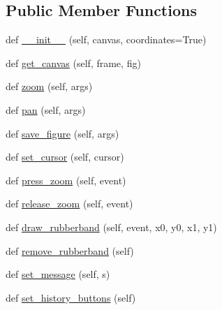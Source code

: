 \subsection*{Public Member Functions}
\begin{DoxyCompactItemize}
\item 
def \hyperlink{classmatplotlib_1_1backends_1_1backend__wx_1_1NavigationToolbar2Wx_a3137d7818c7e5f9a370df4bff05e7adf}{\+\_\+\+\_\+init\+\_\+\+\_\+} (self, canvas, coordinates=True)
\item 
def \hyperlink{classmatplotlib_1_1backends_1_1backend__wx_1_1NavigationToolbar2Wx_ac02fc7096eecaabcb0538ec2cf7f2170}{get\+\_\+canvas} (self, frame, fig)
\item 
def \hyperlink{classmatplotlib_1_1backends_1_1backend__wx_1_1NavigationToolbar2Wx_a7b47ebbb1401a540b94439461921f91b}{zoom} (self, args)
\item 
def \hyperlink{classmatplotlib_1_1backends_1_1backend__wx_1_1NavigationToolbar2Wx_aecc155682fff0265b7fd11c6ae9d7a18}{pan} (self, args)
\item 
def \hyperlink{classmatplotlib_1_1backends_1_1backend__wx_1_1NavigationToolbar2Wx_a2f8a2887028dd4f686db5f043cb2ff38}{save\+\_\+figure} (self, args)
\item 
def \hyperlink{classmatplotlib_1_1backends_1_1backend__wx_1_1NavigationToolbar2Wx_ac43350c893551da4d8e2e45034fde822}{set\+\_\+cursor} (self, cursor)
\item 
def \hyperlink{classmatplotlib_1_1backends_1_1backend__wx_1_1NavigationToolbar2Wx_ad24515f69be6c205d389f6c0b7505c96}{press\+\_\+zoom} (self, event)
\item 
def \hyperlink{classmatplotlib_1_1backends_1_1backend__wx_1_1NavigationToolbar2Wx_abe253b7beb5b2c2a0550a7700edc3547}{release\+\_\+zoom} (self, event)
\item 
def \hyperlink{classmatplotlib_1_1backends_1_1backend__wx_1_1NavigationToolbar2Wx_abecd0158edf9c23c91fc3543c902442f}{draw\+\_\+rubberband} (self, event, x0, y0, x1, y1)
\item 
def \hyperlink{classmatplotlib_1_1backends_1_1backend__wx_1_1NavigationToolbar2Wx_a0d61b4aaab838914ba7abf52ef2f217c}{remove\+\_\+rubberband} (self)
\item 
def \hyperlink{classmatplotlib_1_1backends_1_1backend__wx_1_1NavigationToolbar2Wx_a1feb9d32059eab5b11a91b153a8b199b}{set\+\_\+message} (self, s)
\item 
def \hyperlink{classmatplotlib_1_1backends_1_1backend__wx_1_1NavigationToolbar2Wx_ac2312133fe5b6dc8282a67c32223cc2c}{set\+\_\+history\+\_\+buttons} (self)
\end{DoxyCompactItemize}
